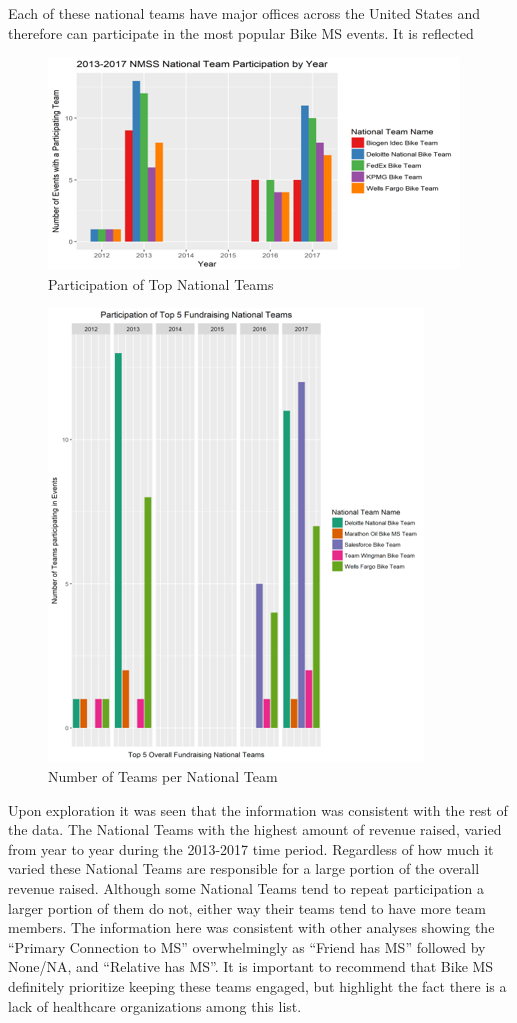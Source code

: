 \documentclass[]{article}
\begin{document}
Each of these national teams have major offices across the United States
and therefore can participate in the most popular Bike MS events. It is
reflected

\begin{figure}
\centering
\includegraphics{nationalteams2.png}
\caption{Participation of Top National Teams}
\end{figure}

\begin{figure}
\centering
\includegraphics{nationalteams3.png}
\caption{Number of Teams per National Team}
\end{figure}

Upon exploration it was seen that the information was consistent with
the rest of the data. The National Teams with the highest amount of
revenue raised, varied from year to year during the 2013-2017 time
period. Regardless of how much it varied these National Teams are
responsible for a large portion of the overall revenue raised. Although
some National Teams tend to repeat participation a larger portion of
them do not, either way their teams tend to have more team members. The
information here was consistent with other analyses showing the
``Primary Connection to MS'' overwhelmingly as ``Friend has MS''
followed by None/NA, and ``Relative has MS''. It is important to
recommend that Bike MS definitely prioritize keeping these teams
engaged, but highlight the fact there is a lack of healthcare
organizations among this list.
\end{document}
